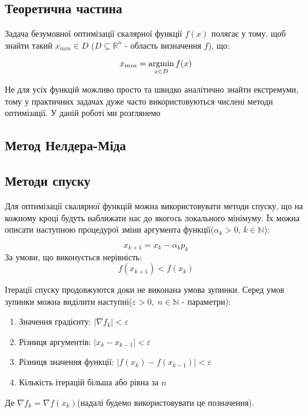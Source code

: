 \begin{center}
    \section*{Теоретична частина}
\end{center}

Задача безумовної оптимізації скалярної функції $f(x)$
полягає у тому, щоб знайти такий $x_{min} \in D$
($ D \subseteq \mathbb{R}^n $ - область визначення $f$), що:

\begin{equation} \label{eq:optimization_task}
    x_{min} = \mathop{\mathrm{argmin}}\limits_{x \in D} f(x)
\end{equation}

Не для усіх функцій можливо просто та швидко
аналітично знайти екстремуми, тому у практичних
задачах дуже часто використовуються числені методи
оптимізації. У даній роботі ми розглянемо

\subsection*{Метод Нелдера-Міда}

\subsection*{Методи спуску}

Для оптимізації скалярної функцій можна
використовувати методи спуску, що на кожному кроці
будуть наближати нас до якогось локального мінімуму.
Їх можна описати наступною процедурої зміни
аргумента функції($\alpha_k > 0$, $k \in \mathbb{N}$):

\begin{equation} \label{eq:descent}
    x_{k+1} = x_{k} - \alpha_k p_{k}
\end{equation}
За умови, що виконується нерівність:
\begin{equation} \label{eq:descent_require}
    f(x_{k+1}) < f(x_k)
\end{equation}

Ітерації спуску продовжуются доки не виконана умова зупинки.
Серед умов зупинки можна виділити наступні($\varepsilon > 0,\;
n \in \mathbb{N}$ - параметри):

\begin{enumerate}
    \item Значення градієнту: $|\nabla f_k| < \varepsilon$
    \item Різниця аргументів: $|x_k - x_{k-1}| < \varepsilon$
    \item Різниця значення функції: $|f(x_k) - f(x_{k-1})| < \varepsilon$
    \item Кількість ітерацій більша або рівна за $n$
\end{enumerate}
Де $ \nabla f_{k} = \nabla f(x_{k})$(надалі будемо
використовувати це позначення).

